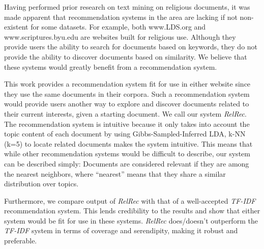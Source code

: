 
Having performed prior research on text mining on religious documents, it was made apparent that recommendation systems in the area are lacking if not non-existent for some datasets. For example, both www.LDS.org and www.scriptures.byu.edu are websites built for religious use. Although they provide users the ability to search for documents based on keywords, they do not provide the ability to discover documents based on similarity. We believe that these systems would greatly benefit from a recommendation system.

This work provides a recommendation system fit for use in either website since they use the same documents in their corpora. Such a recommendation system would provide users another way to explore and discover documents related to their current interests, given a starting document. We call our system \emph{RelRec}. The recommendation system is intuitive because it only takes into account the topic content of each document by using Gibbs-Sampled-Inferred LDA, k-NN (k=5) to locate related documents makes the system intuitive. This means that while other recommendation systems would be difficult to describe, our system can be described simply: Documents are considered relevant if they are among the nearest neighbors, where “nearest” means that they share a similar distribution over topics.

Furthermore, we compare output of \emph{RelRec} with that of a well-accepted \emph{TF-IDF} recommendation system. This lends credibility to the results and show that either system would be fit for use in these systems. \emph{RelRec} does/doesn’t outperform the \emph{TF-IDF} system in terms of coverage and serendipity, making it robust and preferable.
